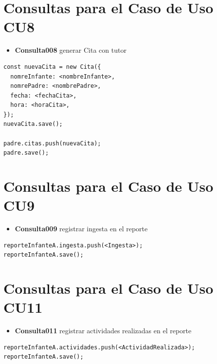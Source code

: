 \section{Consultas para el Caso de Uso CU8}

\begin{itemize}
    \item \textbf{Consulta008} generar Cita con tutor
\end{itemize}

\begin{verbatim}
const nuevaCita = new Cita({
  nomreInfante: <nombreInfante>,
  nomrePadre: <nombrePadre>,
  fecha: <fechaCita>,
  hora: <horaCita>,
});
nuevaCita.save();

padre.citas.push(nuevaCita);
padre.save();

\end{verbatim}

\section{Consultas para el Caso de Uso CU9}

\begin{itemize}
    \item \textbf{Consulta009} registrar ingesta en el reporte
\end{itemize}

\begin{verbatim}
reporteInfanteA.ingesta.push(<Ingesta>);
reporteInfanteA.save();
\end{verbatim}


\section{Consultas para el Caso de Uso CU11}

\begin{itemize}
    \item \textbf{Consulta011} registrar actividades realizadas en el reporte
\end{itemize}

\begin{verbatim}
reporteInfanteA.actividades.push(<ActividadRealizada>);
reporteInfanteA.save();
\end{verbatim}

